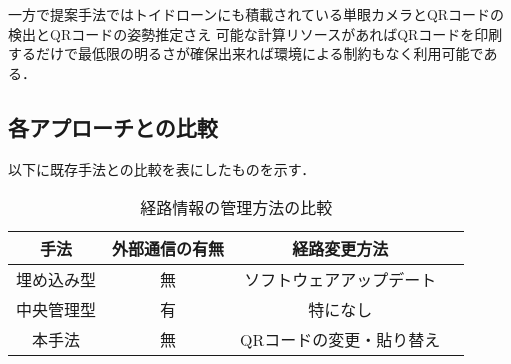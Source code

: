 一方で提案手法ではトイドローンにも積載されている単眼カメラとQRコードの検出とQRコードの姿勢推定さえ
可能な計算リソースがあればQRコードを印刷するだけで最低限の明るさが確保出来れば環境による制約もなく利用可能である．

\subsection{各アプローチとの比較}
以下に既存手法との比較を表にしたものを示す．

\begin{table}[h]
    \caption{各自己位置推定手法との比較}
    \label{table:compare_localization}
    \centering
\end{table}

\begin{table}[h]
    \caption{経路情報の管理方法の比較}
    \label{table:compare_route_info}
    \centering
    \begin{tabular}{cccc}
        \hline
        手法 & 外部通信の有無 & 経路変更方法   \\
        \hline \hline
        埋め込み型 & 無 & ソフトウェアアップデート \\
        中央管理型 & 有 & 特になし   \\
        本手法 & 無 & QRコードの変更・貼り替え   \\
        \hline
    \end{tabular}
\end{table}
